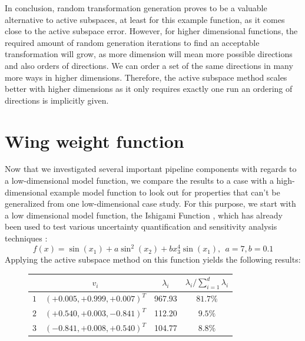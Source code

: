 \documentclass[
  a4paper,  %
  twoside,  %
  bibliography=totoc,
  headsepline,
  cleardoublepage=empty,
  parskip=half,
  draft=false
]{scrbook}
\begin{document}
In conclusion, random transformation generation proves to be a valuable alternative to active subspaces, at least for this example function, as it comes close to the active subspace error.
However, for higher dimensional functions, the required amount of random generation iterations to find an acceptable transformation will grow, as more dimension will mean more possible directions and also orders of directions.
We can order a set of the same directions in many more ways in higher dimensions.
Therefore, the active subspace method scales better with higher dimensions as it only requires exactly one run an ordering of directions is implicitly given.

\section{Wing weight function}

Now that we investigated several important pipeline components with regards to a low-dimensional model function, we compare the results to a case with a high-dimensional example model function to look out for properties that can't be generalized from one low-dimensional case study.
For this purpose, we start with a low dimensional model function, the Ishigami Function \cite{}, which has already been used to test various uncertainty quantification \cite{} and sensitivity analysis techniques \cite{}:
\begin{equation}
f(x)=\sin(x_1) + a \sin^2(x_2) + b x_3^4 \sin(x_1), ~~ a = 7, b=0.1
\end{equation}
Applying the active subspace method on this function yields the following results:

\begin{mdframed}[style=style]
\begin{figure}[H]
\centering
  \begin{tabular}{ l c c c}
& $v_i$ & $\lambda_i$ & $\lambda_i / \sum_{i=1}^d \lambda_i$\\
\hline
$1$ \vline & $(+0.005, +0.999, +0.007)^T$ & 967.93 & $81.7\%$\\
$2$ \vline & $(+0.540, +0.003, -0.841)^T$ & 112.20 & $9.5\%$\\
$3$ \vline & $(-0.841, +0.008, +0.540)^T$ & 104.77 & $8.8\%$\\
\end{tabular}

\delimit

\end{figure}
\end{mdframed}
\end{document}
